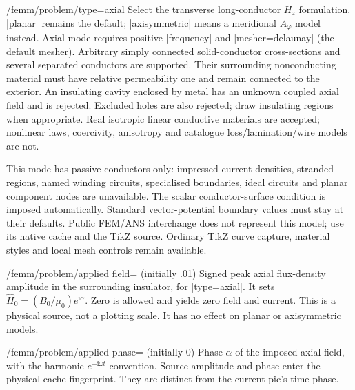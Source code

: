 \begin{key}{/femm/problem/type=axial}
Select the transverse long-conductor $H_z$ formulation. |planar| remains the
default; |axisymmetric| means a meridional $A_\varphi$ model instead.
Axial mode requires positive |frequency| and |mesher=delaunay| (the default
mesher). Arbitrary simply connected solid-conductor cross-sections and several
separated conductors are supported. Their surrounding nonconducting material
must have relative permeability one and remain connected to the exterior.
An insulating cavity enclosed by metal has an unknown coupled axial field and
is rejected. Excluded holes are also rejected; draw insulating regions when
appropriate. Real isotropic linear conductive materials are accepted; nonlinear
laws, coercivity, anisotropy and catalogue loss/lamination/wire models are not.

This mode has passive conductors only: impressed current densities, stranded
regions, named winding circuits, specialised boundaries, ideal circuits and
planar component nodes are unavailable. The scalar conductor-surface condition
is imposed automatically. Standard vector-potential boundary values must stay
at their defaults. Public FEM/ANS interchange does not represent this model;
use its native cache and the TikZ source. Ordinary TikZ curve capture, material
styles and local mesh controls remain available.
\end{key}
\begin{key}{/femm/problem/applied field= (initially .01)}
Signed peak axial flux-density amplitude in the surrounding insulator, for
|type=axial|. It sets $\widehat H_0=(B_0/\mu_0)e^{\mathrm i\alpha}$.
Zero is allowed and yields zero field and current. This is a physical source,
not a plotting scale. It has no effect on planar or axisymmetric models.
\end{key}
\begin{key}{/femm/problem/applied phase= (initially 0)}
Phase $\alpha$ of the imposed axial field, with the harmonic
$e^{+\mathrm i\omega t}$ convention. Source amplitude and phase enter the
physical cache fingerprint. They are distinct from the current pic's time phase.
\end{key}

